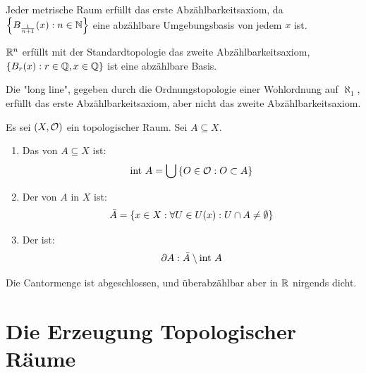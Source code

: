 \documentclass{report}
\begin{document}
\begin{proposition}
	Jeder metrische Raum erfüllt das erste Abzählbarkeitsaxiom, da $\qty{B_{\frac{1}{n+1}}(x) : n \in \mathbb{N}}$ eine abzählbare Umgebungsbasis von jedem $x$ ist.
\end{proposition}
\begin{proposition}
	$\mathbb{R}^n$ erfüllt mit der Standardtopologie das zweite Abzählbarkeitsaxiom, $\qty{B_r(x) : r \in \mathbb{Q}, x \in \mathbb{Q}}$ ist eine abzählbare Basis.
\end{proposition}
\begin{proposition}
	Die "long line", gegeben durch die Ordnungstopologie einer Wohlordnung auf $\aleph_1$, erfüllt das erste Abzählbarkeitsaxiom, aber nicht das zweite Abzählbarkeitsaxiom.
\end{proposition}
\begin{definition}
	Es sei $(X, \mathcal{O})$ ein topologischer Raum. Sei $A \subseteq X$.
	\begin{enumerate}
		\item Das  von $A \subseteq X$ ist:
		\begin{align*}
			\textnormal{int}~ A = \bigcup\qty{O \in \mathcal{O}: O \subset A}
		\end{align*}
		\item Der  von $A$ in $X$ ist:
		\begin{align*}
			\bar A = \qty{x \in X: \forall U \in U(x) : U \cap A \neq \emptyset}
		\end{align*}
		\item Der  ist:
		\begin{align*}
			\partial A : \bar A \setminus \textnormal{int}~ A
		\end{align*}
	\end{enumerate}
\end{definition}
\begin{theorem}
	Die Cantormenge ist abgeschlossen, und überabzählbar aber in $\mathbb{R}$ nirgends dicht.
\end{theorem}
\chapter{Die Erzeugung Topologischer Räume}
\end{document}
